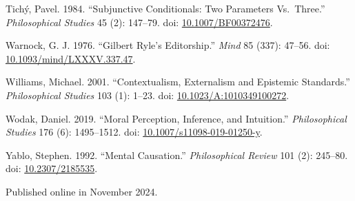 \documentclass[
  11pt,
  letterpaper,
  DIV=11,
  numbers=noendperiod,
  twoside]{scrartcl}
\newlength{\cslhangindent}
\newenvironment{CSLReferences}[2] %
 {\begin{list}{}{%
  \setlength{\itemindent}{0pt}
  \setlength{\leftmargin}{0pt}
  \setlength{\parsep}{0pt}
  \ifodd #1
   \setlength{\leftmargin}{\cslhangindent}
   \setlength{\itemindent}{-1\cslhangindent}
  \fi
  \setlength{\itemsep}{#2\baselineskip}}}
 {\end{list}}
\begin{document}
\begin{CSLReferences}{1}{0}
Tichý, Pavel. 1984. {``Subjunctive Conditionals: Two Parameters
Vs.~Three.''} \emph{Philosophical Studies} 45 (2): 147--79. doi:
\href{https://doi.org/10.1007/BF00372476}{10.1007/BF00372476}.

Warnock, G. J. 1976. {``Gilbert Ryle's Editorship.''} \emph{Mind} 85
(337): 47--56. doi:
\href{https://doi.org/10.1093/mind/LXXXV.337.47}{10.1093/mind/LXXXV.337.47}.

Williams, Michael. 2001. {``Contextualism, Externalism and Epistemic
Standards.''} \emph{Philosophical Studies} 103 (1): 1--23. doi:
\href{https://doi.org/10.1023/A:1010349100272}{10.1023/A:1010349100272}.

Wodak, Daniel. 2019. {``Moral Perception, Inference, and Intuition.''}
\emph{Philosophical Studies} 176 (6): 1495--1512. doi:
\href{https://doi.org/10.1007/s11098-019-01250-y}{10.1007/s11098-019-01250-y}.

Yablo, Stephen. 1992. {``Mental Causation.''} \emph{Philosophical
Review} 101 (2): 245--80. doi:
\href{https://doi.org/10.2307/2185535}{10.2307/2185535}.

\end{CSLReferences}



\noindent Published online in November 2024.
\end{document}
